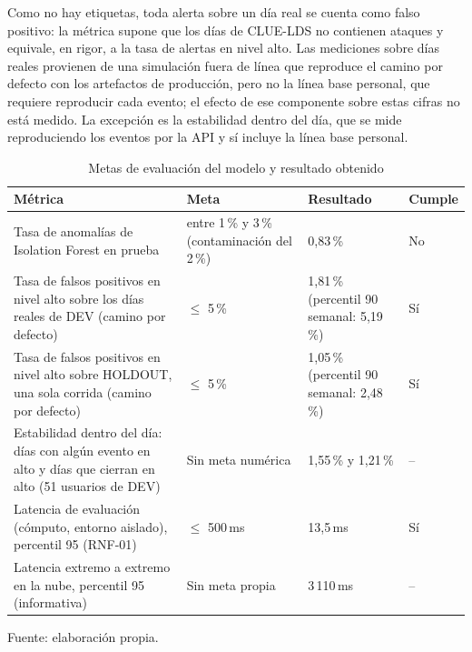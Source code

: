 Como no hay etiquetas, toda alerta sobre un día real se cuenta como falso positivo: la métrica supone que los días de CLUE-LDS no contienen ataques y equivale, en rigor, a la tasa de alertas en nivel alto. Las mediciones sobre días reales provienen de una simulación fuera de línea que reproduce el camino por defecto con los artefactos de producción, pero no la línea base personal, que requiere reproducir cada evento; el efecto de ese componente sobre estas cifras no está medido. La excepción es la estabilidad dentro del día, que se mide reproduciendo los eventos por la API y sí incluye la línea base personal.

\begin{table}[h]
\centering
\caption{Metas de evaluación del modelo y resultado obtenido}
\label{tab:metas-modelo}
\begin{tabular}{p{5.2cm}p{3.2cm}p{3cm}p{1.8cm}}
\hline
Métrica & Meta & Resultado & Cumple \\
\hline
Tasa de anomalías de Isolation Forest en prueba & entre 1\,\% y 3\,\% (contaminación del 2\,\%) & 0,83\,\% & No \\
Tasa de falsos positivos en nivel alto sobre los días reales de DEV (camino por defecto) & $\leq$ 5\,\% & 1,81\,\% (percentil 90 semanal: 5,19\,\%) & Sí \\
Tasa de falsos positivos en nivel alto sobre HOLDOUT, una sola corrida (camino por defecto) & $\leq$ 5\,\% & 1,05\,\% (percentil 90 semanal: 2,48\,\%) & Sí \\
Estabilidad dentro del día: días con algún evento en alto y días que cierran en alto (51 usuarios de DEV) & Sin meta numérica & 1,55\,\% y 1,21\,\% & -- \\
Latencia de evaluación (cómputo, entorno aislado), percentil 95 (RNF-01) & $\leq$ 500\,ms & 13,5\,ms & Sí \\
	\hline
	Latencia extremo a extremo en la nube, percentil 95 (informativa) & Sin meta propia & 3\,110\,ms & -- \\
\hline
\end{tabular}\par
{\small Fuente: elaboración propia.\par}
\end{table}
\FloatBarrier

